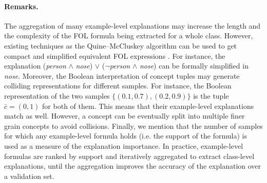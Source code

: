 \documentclass[withindex,glossary]{cam-thesis}
\theoremstyle{plain}
\theoremstyle{definition}
\theoremstyle{remark}
\begin{document}
\paragraph{Remarks.} The aggregation of many example-level explanations may increase the length and the complexity of the FOL formula being extracted for a whole class. However, existing techniques as the Quine–McCluskey algorithm can be used to get compact and simplified equivalent FOL expressions \citep{mccoll1878calculus,quine1952problem,mccluskey1956minimization}. For instance, the explanation (\textit{person} $\wedge$ \textit{nose}) $\vee$ ($\neg$\textit{person} $\wedge$ \textit{nose}) can be formally simplified in \textit{nose}.
Moreover, the Boolean interpretation of concept tuples may generate colliding representations for different samples. For instance, the Boolean representation of the two samples $\{ (0.1, 0.7), (0.2, 0.9) \}$ is the tuple $\bar{c} = (0, 1)$ for both of them. This means that their example-level explanations match as well. %
However, a concept can be eventually split into multiple finer grain concepts to avoid collisions. Finally, we mention that the number of samples for which any example-level formula holds (i.e. the support of the formula) is used as a measure of the explanation importance. In practice, example-level formulas are ranked by support and iteratively aggregated to extract class-level explanations, until the aggregation improves the accuracy of the explanation over a validation set.
\end{document}
